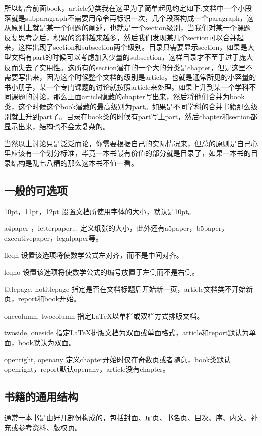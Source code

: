\documentclass[11pt,oneside]{book}
\begin{document}
\begin{common-format}
所以结合前面book，article分类我在这里为了简单起见约定如下:文档中一个小段落就是subparagraph不需要用命令再标识一次，几个段落构成一个paragraph，这从原则上就是某一个问题的阐述，也就是一个section级别，当我们对某一个课题反复思考之后，积累的资料越来越多，然后我们发现某几个section可以合并起来，这样出现了section和subsection两个级别。目录只需要显示section，如果是大型文档有part的时候可以考虑加入少量的subsection，这样目录才不至于过于庞大反而失去了实用性。这所有的section潜在的一个大的分类是chapter，但是这里不需要写出来，因为这个时候整个文档的级别是article。也就是通常所见的小容量的书小册子，某一个专门课题的讨论就按照article来处理。如果上升到某一个学科不同课题的讨论，那么上面article隐藏的chapter写出来，然后将他们合并为book类，这个时候这个book潜藏的最高级别为part。如果是不同学科的合并书籍那么级别就上升到part了。目录在book类的时候有part写上part，然后chapter和section都显示出来，结构也不会太复杂的。

当然以上讨论只是泛泛而论，你需要根据自己的实际情况来，但总的原则是自己心里应该有一个划分标准，毕竟一本书最有价值的部分就是目录了，如果一本书的目录结构是乱七八糟的那么这本书不值一看。

\subsection{一般的可选项}
10pt，11pt，12pt      设置文档所使用字体的大小，默认是10pt。

a4paper ，letterpaper...      定义纸张的大小，此外还有a5paper，b5paper，executivepaper，legalpaper等。

fleqn       设置该选项将使数学公式左对齐，而不是中间对齐。

leqno       设置该选项将使数学公式的编号放置于左侧而不是右侧。

titlepage, notitlepage       指定是否在文档标题后开始新一页，article文档类不开始新页，report和book开始。

onecolumn, twocolumn       指定LaTeX以单栏或双栏方式排版文档。

twoside, oneside       指定LaTeX排版文档为双面或单面格式，article和report默认为单面，book默认为双面。

openright, openany       定义chapter开始时仅在奇数页或者随意，book类默认openright，report默认openany，article没有chapter。




\subsection{书籍的通用结构}
通常一本书是由好几部份构成的，包括封面、扉页、书名页、目次、序、内文、补充或参考资料、版权页。


\end{common-format}
\end{document}

